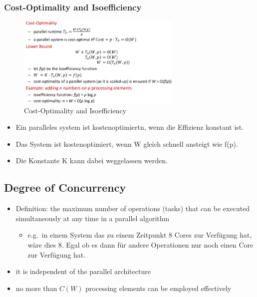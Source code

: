 \hypertarget{cost-optimality-and-isoefficiency}{%
\subsubsection{Cost-Optimality and
Isoefficiency}\label{cost-optimality-and-isoefficiency}}

\begin{figure}[H]
\centering
\includegraphics[width=0.7\textwidth]{figures/isoefficiency_costoptimality.png}
\caption{Cost-Optimality and Isoefficiency}
\end{figure}

\begin{itemize}
\tightlist
\item
  Ein paralleles system ist kostenoptimiertn, wenn die Effizienz
  konstant ist.
\item
  Das System ist kostenoptimiert, wenn W gleich schnell ansteigt wie
  f(p).
\item
  Die Konstante K kann dabei weggelassen werden.
\end{itemize}

\hypertarget{degree-of-concurrency}{%
\subsection{Degree of Concurrency}\label{degree-of-concurrency}}

\begin{itemize}
\tightlist
\item
  Definition: the maximum number of operations (tasks) that can be
  executed simultaneously at any time in a parallel algorithm

  \begin{itemize}
  \tightlist
  \item
    e.g.~in einem System das zu einem Zeitpunkt 8 Cores zur Verfügung
    hat, wäre dies 8. Egal ob es dann für andere Operationen nur noch
    einen Core zur Verfügung hat.
  \end{itemize}
\item
  it is independent of the parallel architecture
\item
  no more than $C(W)$ processing elements can be employed effectively
\end{itemize}

